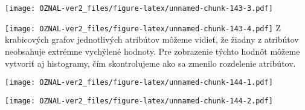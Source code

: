 \documentclass[
]{article}
\newenvironment{Shaded}{\begin{snugshade}}{\end{snugshade}}
\newcommand{\AttributeTok}[1]{\textcolor[rgb]{0.77,0.63,0.00}{#1}}
\newcommand{\FunctionTok}[1]{\textcolor[rgb]{0.00,0.00,0.00}{#1}}
\newcommand{\NormalTok}[1]{#1}
\newcommand{\SpecialCharTok}[1]{\textcolor[rgb]{0.00,0.00,0.00}{#1}}
\newcommand{\StringTok}[1]{\textcolor[rgb]{0.31,0.60,0.02}{#1}}
\begin{document}
\texttt{[image: OZNAL-ver2\_files/figure-latex/unnamed-chunk-143-3.pdf]}

\begin{Shaded}
\end{Shaded}

\texttt{[image: OZNAL-ver2\_files/figure-latex/unnamed-chunk-143-4.pdf]}
Z krabicových grafov jednotlivých atribútov môžeme vidieť, že žiadny z
atribútov neobsahuje extrémne vychýlené hodnoty. Pre zobrazenie týchto
hodnôt môžeme vytvoriť aj histogramy, čím skontrolujeme ako sa zmenilo
rozdelenie atribútov.

\begin{Shaded}
\end{Shaded}

\texttt{[image: OZNAL-ver2\_files/figure-latex/unnamed-chunk-144-1.pdf]}

\begin{Shaded}
\end{Shaded}

\texttt{[image: OZNAL-ver2\_files/figure-latex/unnamed-chunk-144-2.pdf]}

\begin{Shaded}
\end{Shaded}
\end{document}
